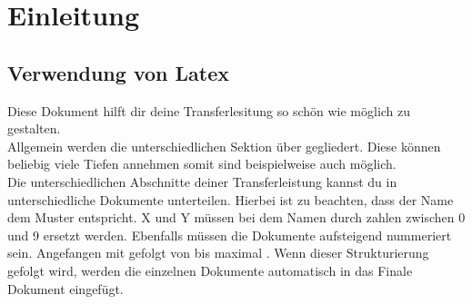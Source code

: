 \section{Einleitung}

\subsection{Verwendung von Latex}
Diese Dokument hilft dir deine Transferlesitung so schön wie möglich zu gestalten.\\
Allgemein werden die unterschiedlichen Sektion über  gegliedert. Diese können beliebig viele Tiefen annehmen somit sind beispielweise auch  möglich. \\
Die unterschiedlichen Abschnitte deiner Transferleistung kannst du in unterschiedliche Dokumente unterteilen. Hierbei ist zu beachten, dass der Name dem Muster  entspricht. X und Y müssen bei dem Namen durch zahlen zwischen 0 und 9 ersetzt werden. Ebenfalls müssen die Dokumente aufsteigend nummeriert sein. Angefangen mit  gefolgt von  bis maximal . Wenn dieser Strukturierung gefolgt wird, werden die einzelnen Dokumente automatisch in das Finale Dokument eingefügt.
